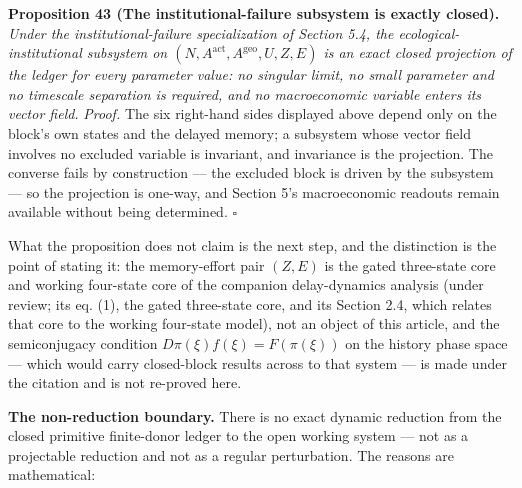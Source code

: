 \documentclass[11pt]{article}
\begin{document}
\textbf{Proposition 43 (The institutional-failure subsystem is exactly closed).} \emph{Under the institutional-failure
specialization of Section 5.4, the ecological-institutional subsystem on \((N, A^{\mathrm{act}}, A^{\mathrm{geo}}, U, Z, E)\) is an exact closed projection of the ledger for every parameter value: no singular limit, no small
parameter and no timescale separation is required, and no macroeconomic variable enters its vector field.}
\emph{Proof.} The six right-hand sides displayed above depend only on the block's own states and the delayed memory; a
subsystem whose vector field involves no excluded variable is invariant, and invariance is the projection. The
converse fails by construction --- the excluded block is driven by the subsystem --- so the projection is
one-way, and Section 5's macroeconomic readouts remain available without being determined. \(\square\)

What the proposition does not claim is the next step, and the distinction is the point of stating it: the
memory-effort pair \((Z, E)\) is the gated three-state core and working four-state core of the companion
delay-dynamics analysis (under review; its eq. (1), the gated three-state core, and its Section 2.4, which
relates that core to the working four-state model), not an object of this article, and the semiconjugacy
condition \(D\pi(\xi) f(\xi) = F(\pi(\xi))\) on the history phase space --- which would carry closed-block
results across to that system --- is made under the citation and is not re-proved here.

\textbf{The non-reduction boundary.} There is no exact dynamic reduction
from the closed primitive finite-donor ledger to the open working system
--- not as a projectable reduction and not as a regular perturbation.
The reasons are mathematical:
\end{document}
